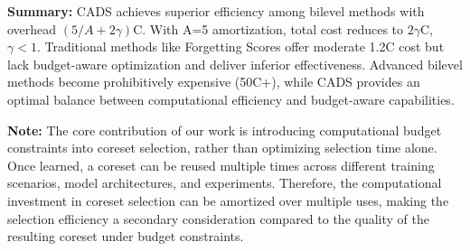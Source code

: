 \begin{table}[h!]
\centering
\caption{Computational Cost Analysis of Established Baselines.}
\label{tab:cost_analysis}
\end{table}

\textbf{Summary:} CADS achieves superior efficiency among bilevel methods with overhead $(5/A + 2\gamma)\text{C}$. With A=5 amortization, total cost reduces to $2\gamma\text{C}$, $\gamma < 1$. Traditional methods like Forgetting Scores offer moderate 1.2C cost but lack budget-aware optimization and deliver inferior effectiveness. Advanced bilevel methods become prohibitively expensive (50C+), while CADS provides an optimal balance between computational efficiency and budget-aware capabilities.

\textbf{Note:} The core contribution of our work is introducing computational budget constraints into coreset selection, rather than optimizing selection time alone. Once learned, a coreset can be reused multiple times across different training scenarios, model architectures, and experiments. Therefore, the computational investment in coreset selection can be amortized over multiple uses, making the selection efficiency a secondary consideration compared to the quality of the resulting coreset under budget constraints.
